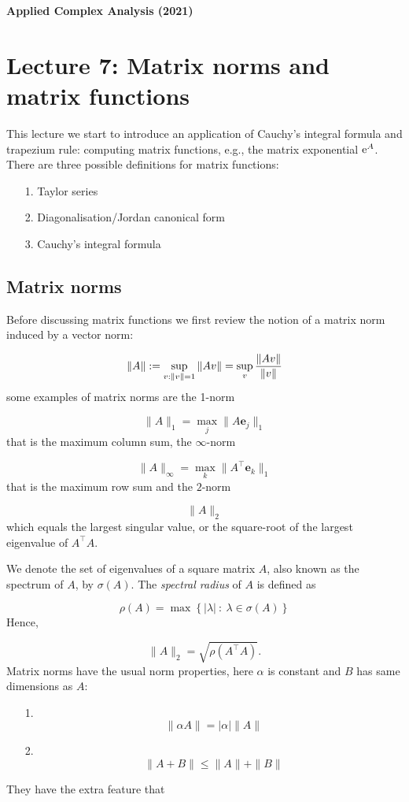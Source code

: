\documentclass[12pt,a4paper]{article}
\def\E{ {\rm e} }
\def\vc#1{ {\mathbf #1} }
\begin{document}
\textbf{Applied Complex Analysis (2021)}

\section{Lecture 7: Matrix norms and matrix functions}
This lecture we start to introduce an application of Cauchy's integral formula and trapezium rule: computing matrix functions, e.g., the matrix exponential $\E^A$. There are three possible definitions for matrix functions:

\begin{itemize}
\item[1. ] Taylor series


\item[2. ] Diagonalisation/Jordan canonical form


\item[3. ] Cauchy's integral formula

\end{itemize}
\subsection{Matrix norms}
Before discussing matrix functions we first review the notion of a matrix norm induced by a vector norm:

\[
\| A\| := \sup_{v : \| v \| = 1} \| A v\| = \sup_{v } {\| A v\| \over \| v\|}
\]
some examples of matrix norms are the 1-norm

\[
\|A \|_1 = \max_j \|A \vc e_j\|_1
\]
that is the maximum column sum, the $\infty$-norm

\[
\|A \|_\infty = \max_k \|A^\top \vc e_k\|_1
\]
that is the maximum row sum and the $2$-norm

\[
\|A \|_2
\]
which equals the largest singular value, or the square-root of the largest eigenvalue of $A^\top A$.

We denote the set of eigenvalues of a square matrix $A$, also known as the spectrum of $A$, by $\sigma(A)$. The \emph{spectral radius} of $A$ is defined as

\[
\rho(A) = \max\left\lbrace \vert \lambda \vert \: : \: \lambda \in \sigma(A)   \right\rbrace
\]
Hence,

\[
\|A \|_2 = \sqrt{\rho(A^\top A)}.
\]
Matrix norms have the usual norm properties, here  $\alpha$ is constant and $B$ has same dimensions as $A$:

\begin{itemize}
\item[1. ] \[
\|\alpha A\| = |\alpha| \| A \|
\]

\item[2. ] \[
\| A + B \| \leq \|A \| + \|B \|
\]
\end{itemize}
They have the extra feature that
\end{document}
